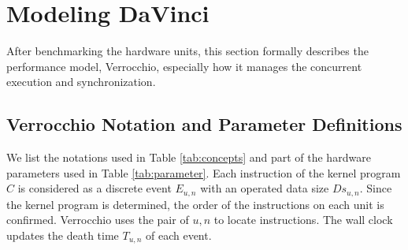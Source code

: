 \section{Modeling DaVinci}

After benchmarking the hardware units, this section formally describes the performance model, Verrocchio, especially how it manages the concurrent execution and synchronization.

\subsection{Verrocchio Notation and Parameter Definitions}

We list the notations used in Table \ref{tab:concepts} and part of the hardware parameters used in Table \ref{tab:parameter}. Each instruction of the kernel program $C$ is considered as a discrete event $E_{u, n}$ with an operated data size $Ds_{u, n}$. Since the kernel program is determined, the order of the instructions on each unit is confirmed. Verrocchio uses the pair of $u, n$ to locate instructions. The wall clock updates the death time $T_{u, n}$ of each event.

